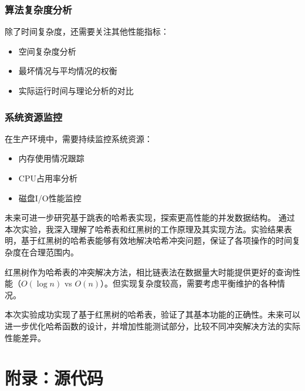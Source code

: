 \documentclass[12pt,a4paper]{article}
\begin{document}
\subsubsection{算法复杂度分析}
除了时间复杂度，还需要关注其他性能指标：
\begin{itemize}
\item 空间复杂度分析
\item 最坏情况与平均情况的权衡
\item 实际运行时间与理论分析的对比
\end{itemize}

\subsubsection{系统资源监控}
在生产环境中，需要持续监控系统资源：
\begin{itemize}
\item 内存使用情况跟踪
\item CPU占用率分析
\item 磁盘I/O性能监控
\end{itemize}

未来可进一步研究基于跳表的哈希表实现，探索更高性能的并发数据结构。
通过本次实验，我深入理解了哈希表和红黑树的工作原理及其实现方法。实验结果表明，基于红黑树的哈希表能够有效地解决哈希冲突问题，保证了各项操作的时间复杂度在合理范围内。

红黑树作为哈希表的冲突解决方法，相比链表法在数据量大时能提供更好的查询性能（\(O(\log n)\) vs \(O(n)\)）。但实现复杂度较高，需要考虑平衡维护的各种情况。

本次实验成功实现了基于红黑树的哈希表，验证了其基本功能的正确性。未来可以进一步优化哈希函数的设计，并增加性能测试部分，比较不同冲突解决方法的实际性能差异。

\section{附录：源代码}
\end{document}
